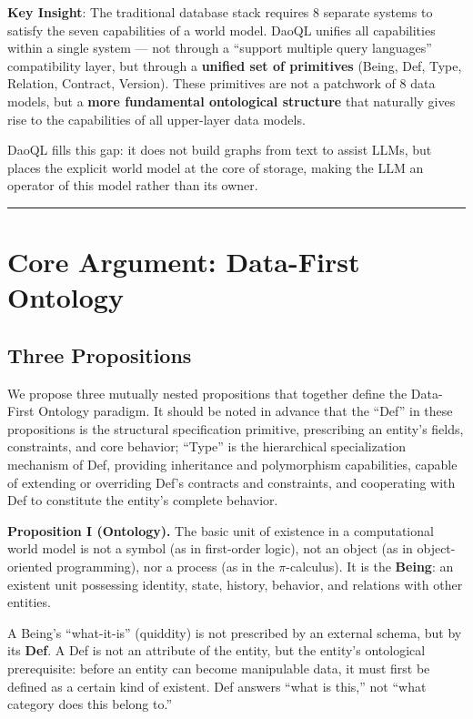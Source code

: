 \documentclass[11pt,a4paper]{article}
\begin{document}
\textbf{Key Insight}: The traditional database stack requires 8 separate
systems to satisfy the seven capabilities of a world model. DaoQL
unifies all capabilities within a single system --- not through a
``support multiple query languages'' compatibility layer, but through a
\textbf{unified set of primitives} (Being, Def, Type, Relation,
Contract, Version). These primitives are not a patchwork of 8 data
models, but a \textbf{more fundamental ontological structure} that
naturally gives rise to the capabilities of all upper-layer data models.

DaoQL fills this gap: it does not build graphs from text to assist LLMs,
but places the explicit world model at the core of storage, making the
LLM an operator of this model rather than its owner.

\begin{center}\rule{0.5\linewidth}{0.5pt}\end{center}

\section{Core Argument: Data-First
Ontology}\label{core-argument-data-first-ontology}

\subsection{Three Propositions}\label{three-propositions}

We propose three mutually nested propositions that together define the
Data-First Ontology paradigm. It should be noted in advance that the
``Def'' in these propositions is the structural specification primitive,
prescribing an entity's fields, constraints, and core behavior; ``Type''
is the hierarchical specialization mechanism of Def, providing
inheritance and polymorphism capabilities, capable of extending or
overriding Def's contracts and constraints, and cooperating with Def to
constitute the entity's complete behavior.

\textbf{Proposition I (Ontology).} The basic unit of existence in a
computational world model is not a symbol (as in first-order logic), not
an object (as in object-oriented programming), nor a process (as in the
\(\pi\)-calculus). It is the \textbf{Being}: an existent unit possessing
identity, state, history, behavior, and relations with other entities.

A Being's ``what-it-is'' (quiddity) is not prescribed by an external
schema, but by its \textbf{Def}. A Def is not an attribute of the
entity, but the entity's ontological prerequisite: before an entity can
become manipulable data, it must first be defined as a certain kind of
existent. Def answers ``what is this,'' not ``what category does this
belong to.''
\end{document}
